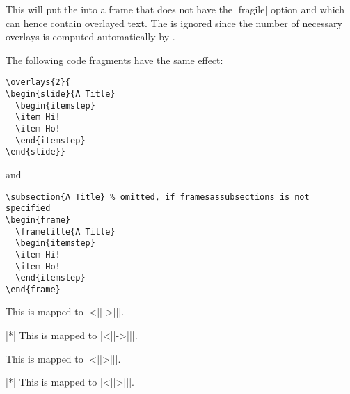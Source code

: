 \begin{command}{\overlays{}}
  This will put the  into a frame that does not have the |fragile| option and which can hence contain overlayed text. The  is ignored since the number of necessary overlays is computed automatically by \beamer.

  \example
  The following code fragments have the same effect:

\begin{verbatim}
\overlays{2}{
\begin{slide}{A Title}
  \begin{itemstep}
  \item Hi!
  \item Ho!
  \end{itemstep}
\end{slide}}
\end{verbatim}
  and
\begin{verbatim}
\subsection{A Title} % omitted, if framesassubsections is not specified
\begin{frame}
  \frametitle{A Title}
  \begin{itemstep}
  \item Hi!
  \item Ho!
  \end{itemstep}
\end{frame}
\end{verbatim}
\end{command}

\begin{command}{\fromSlide{}}
  This is mapped to |\uncover<||->{||}|.
\end{command}

\begin{command}{\fromSlide|*|}
  This is mapped to |\only<||->{||}|.
\end{command}

\begin{command}{\onlySlide{}}
  This is mapped to |\uncover<||>{||}|.
\end{command}

\begin{command}{\onlySlide|*|}
  This is mapped to |\only<||>{||}|.
\end{command}

